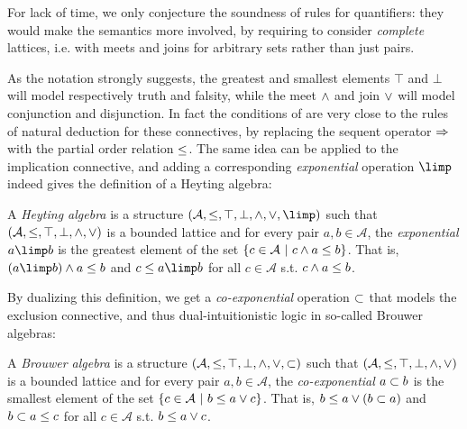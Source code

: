 \begin{remark}
  For lack of time, we only conjecture the soundness of rules for quantifiers:
  they would make the semantics more involved, by requiring to consider
  \emph{complete} lattices, i.e. with meets and joins for arbitrary sets rather
  than just pairs.
\end{remark}

As the notation strongly suggests, the greatest and smallest elements $\top$ and
$\bot$ will model respectively truth and falsity, while the meet $\land$ and
join $\lor$ will model conjunction and disjunction. In fact the conditions of
 are very close to the rules of natural deduction for
these connectives, by replacing the sequent operator $\Rightarrow$ with the partial
order relation $\leq$. The same idea can be applied to the implication
connective, and adding a corresponding \emph{exponential} operation $\lexp$
indeed gives the definition of a Heyting algebra:

\begin{definition}
  A \emph{Heyting algebra} is a structure $(\mathcal{A}, \sement, \ltop, \lbot,
  \lmeet, \ljoin, \lexp)$ such that $(\mathcal{A}, \leq, \top, \bot,
  \land, \lor)$ is a bounded lattice and for every pair $a, b \in
  \mathcal{A}$, the \emph{exponential} $a \lexp b$ is the greatest element of
  the set $\left\{c \in \mathcal{A} ~\middle|~ c \land a \leq b\right\}$. That is, $(a \lexp
  b) \lmeet a \sement b$ and $c \sement a \lexp b$ for all $c \in \mathcal{A}$
  s.t. $c \land a \leq b$.
\end{definition}

By dualizing this definition, we get a \emph{co-exponential} operation $\subset$
that models the exclusion connective, and thus dual-intuitionistic logic in
so-called Brouwer algebras:

\begin{definition}
  A \emph{Brouwer algebra} is a structure $(\mathcal{A}, \leq, \top, \bot,
  \land, \lor, \subset)$ such that $(\mathcal{A}, \leq, \top, \bot,
  \land, \lor)$ is a bounded lattice and for every pair $a, b \in
  \mathcal{A}$, the \emph{co-exponential} $a \subset b$ is the smallest element
  of the set $\left\{c \in \mathcal{A} ~\middle|~ b \leq a \lor c\right\}$. That is, $b
  \leq a \lor (b \subset a)$ and $b \subset a \leq c$ for all $c \in
  \mathcal{A}$ s.t. $b \leq a \lor c$.
\end{definition}

